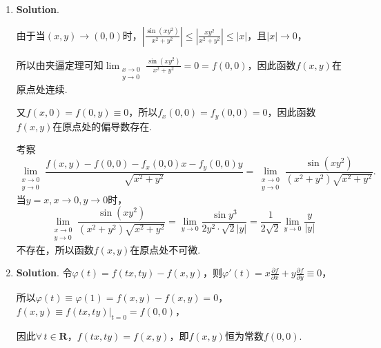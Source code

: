 \documentclass[../main.tex]{subfiles}
\begin{document}
\begin{enumerate}
          考虑$D$的坐标轴边界. 由对称性不妨只考虑在$y$轴上时，此时
          \[
              x=0\,z = y^{2}+y=\left(y+\frac{1}{2}\right)^{2}-\frac{1}{4}\in\left[
                  -\frac{1}{4},6\right].
          \]
          考虑$D$的斜边边界，即直线$x+y=-3$，此时
          \[
              z = x^{2}+(-3-x)^{2}-x(-3-x)+x-3-x = 3x^{2}+9x+6=3\left(x+\frac{3}{2}\right
              )^{2}-\frac{3}{4}\in\left[-\frac{3}{4},6\right].
          \]
          综上所述，曲面在区域$D$上的最低点为$Q(-1,-1)$，$z(Q)=-1$.

          取平面的法向量为$\boldsymbol{n}= (2,1,-1)\times(1,2,-1) = (1,1,3)$，

          所以平面方程为$x+1+y+1+3(z+1)=0$，即$x+y+3z+5=0$.

    \item \textbf{Solution}.

          由于当$(x,y)\to(0,0)$时，$\left|\frac{\sin(xy^{2})}{x^{2}+y^{2}}\right| \leq
              \left|\frac{xy^{2}}{x^{2}+y^{2}}\right| \leq |x|$，且$|x|\to 0$，

          所以由夹逼定理可知$\lim_{\substack{x\to 0 \\ y\to 0}}\frac{\sin(xy^{2})}{x^{2}+y^{2}}
              =0=f(0,0)$，因此函数$f(x,y)$在原点处连续.

          又$f(x,0)=f(0,y)\equiv 0$，所以$f_{x}(0,0)=f_{y}(0,0)=0$，因此函数$f(x,y)$在原点处的偏导数存在.

          考察
          \[
              \lim_{\substack{x\to 0 \\ y\to 0}}\frac{f(x,y)-f(0,0)-f_{x}(0,0)x-f_{y}(0,0)y}{\sqrt{x^{2}+y^{2}}}
              = \lim_{\substack{x\to 0 \\ y\to 0}}\frac{\sin(xy^{2})}{(x^{2}+y^{2})\sqrt{x^2+y^2}}.
          \]
          当$y=x,x\to0,y\to0$时，
          \[
              \lim_{\substack{x\to 0 \\ y\to 0}}\frac{\sin(xy^{2})}{(x^{2}+y^{2})\sqrt{x^2+y^2}}
              = \lim_{y\to0}\frac{\sin y^{3}}{2y^{2}\cdot\sqrt{2}|y|}= \frac{1}{2\sqrt{2}}
              \lim_{y\to0}\frac{y}{|y|}
          \]
          不存在，所以函数$f(x,y)$在原点处不可微.

    \item \textbf{Solution}. 令$\varphi(t)=f(tx,ty)-f(x,y)$，则$\varphi'(t)=
              x\frac{\partial f}{\partial x}+y\frac{\partial f}{\partial y}\equiv0$，

          所以$\varphi(t)\equiv \varphi(1)=f(x,y)-f(x,y)=0$，$f(x,y)\equiv f(tx,ty)\Big
              |_{t=0}= f(0,0)$，

          因此$\forall\,t\in\mathbf{R}$，$f(tx,ty)=f(x,y)$，即$f(x,y)$恒为常数$f(0,0)$.
\end{enumerate}
\end{document}
